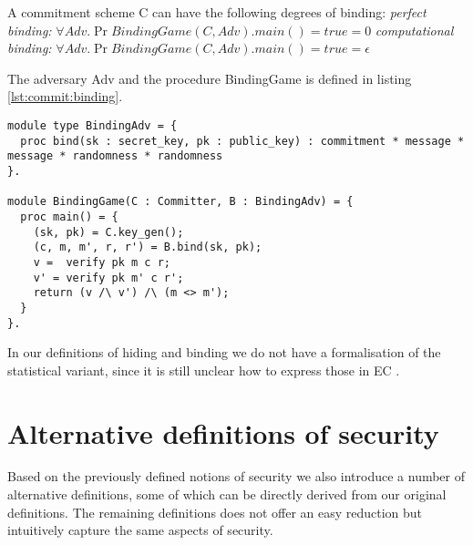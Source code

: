 \begin{definition}[Binding]
  \label{def:commitment:binding}
  A commitment scheme C can have the following degrees of binding:
  \textit{perfect binding:} $\forall Adv. \Pr{BindingGame(C, Adv).main() = true} = 0$
  \textit{computational binding:} $\forall Adv. \Pr{BindingGame(C, Adv).main() = true} = \epsilon$

  The adversary Adv and the procedure BindingGame is defined in listing \ref{lst:commit:binding}.
\begin{lstlisting}[label=lst:commit:binding]
module type BindingAdv = {
  proc bind(sk : secret_key, pk : public_key) : commitment * message * message * randomness * randomness
}.

module BindingGame(C : Committer, B : BindingAdv) = {
  proc main() = {
    (sk, pk) = C.key_gen();
    (c, m, m', r, r') = B.bind(sk, pk);
    v =  verify pk m c r;
    v' = verify pk m' c r';
    return (v /\ v') /\ (m <> m');
  }
}.

\end{lstlisting}
\end{definition}

In our definitions of hiding and binding we do not have a formalisation of the
statistical variant, since it is still unclear how to express those in EC \cite{ec_intro}.


\section{Alternative definitions of security}
\label{sec:commitment:alt-sec}
Based on the previously defined notions of security we also introduce a number
of alternative definitions, some of which can be directly derived from our
original definitions. The remaining definitions does not offer an easy reduction but
intuitively capture the same aspects of security.

